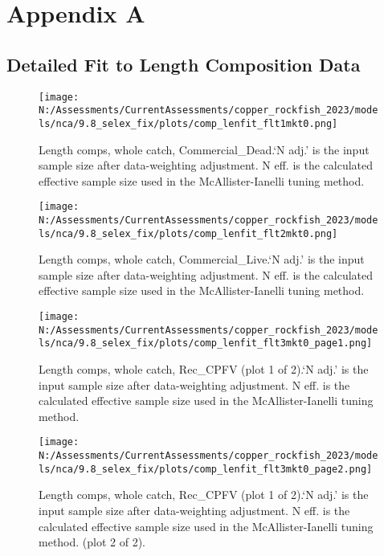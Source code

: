 \documentclass[11pt,
  english,
  letterpaper,
]{article}
\begin{document}
\hypertarget{detailed-fit-comps}{%
\section{Appendix A}\label{detailed-fit-comps}}

\hypertarget{length-data}{%
\subsection{Detailed Fit to Length Composition Data}\label{length-data}}

\begin{figure}
\centering
\texttt{[image: N:/Assessments/CurrentAssessments/copper\_rockfish\_2023/models/nca/9.8\_selex\_fix/plots/comp\_lenfit\_flt1mkt0.png]}
\caption{Length comps, whole catch, Commercial\_Dead.`N adj.' is the input sample size after data-weighting adjustment. N eff. is the calculated effective sample size used in the McAllister-Ianelli tuning method.\label{fig:comp_lenfit_flt1mkt0}}
\end{figure}

\begin{figure}
\centering
\texttt{[image: N:/Assessments/CurrentAssessments/copper\_rockfish\_2023/models/nca/9.8\_selex\_fix/plots/comp\_lenfit\_flt2mkt0.png]}
\caption{Length comps, whole catch, Commercial\_Live.`N adj.' is the input sample size after data-weighting adjustment. N eff. is the calculated effective sample size used in the McAllister-Ianelli tuning method.\label{fig:comp_lenfit_flt2mkt0}}
\end{figure}

\begin{figure}
\centering
\texttt{[image: N:/Assessments/CurrentAssessments/copper\_rockfish\_2023/models/nca/9.8\_selex\_fix/plots/comp\_lenfit\_flt3mkt0\_page1.png]}
\caption{Length comps, whole catch, Rec\_CPFV (plot 1 of 2).`N adj.' is the input sample size after data-weighting adjustment. N eff. is the calculated effective sample size used in the McAllister-Ianelli tuning method.\label{fig:comp_lenfit_flt3mkt0_page1}}
\end{figure}

\begin{figure}
\centering
\texttt{[image: N:/Assessments/CurrentAssessments/copper\_rockfish\_2023/models/nca/9.8\_selex\_fix/plots/comp\_lenfit\_flt3mkt0\_page2.png]}
\caption{Length comps, whole catch, Rec\_CPFV (plot 1 of 2).`N adj.' is the input sample size after data-weighting adjustment. N eff. is the calculated effective sample size used in the McAllister-Ianelli tuning method. (plot 2 of 2).\label{fig:comp_lenfit_flt3mkt0_page2}}
\end{figure}
\end{document}

